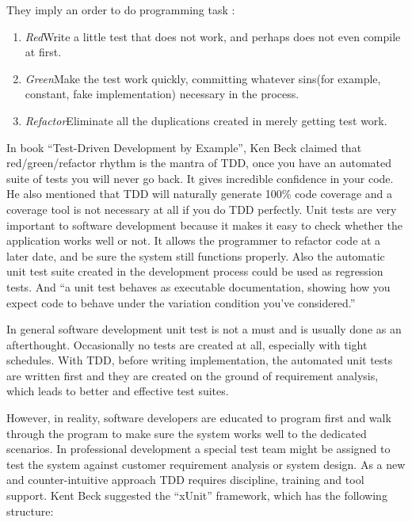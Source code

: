 \documentclass[11pt,twocolumn]{article}
\begin{document}
They imply an order to do programming task \cite{Beck_TDD_2003}:
\begin{enumerate}
\item \emph{Red}\newline Write a little test that does not work, and
  perhaps does not even compile at first.
\item \emph{Green}\newline Make the test work quickly, committing whatever
  sins(for example, constant, fake implementation) necessary in the
  process.
\item \emph{Refactor}\newline Eliminate all the duplications created in
  merely getting test work.
\end{enumerate}

In book ``Test-Driven Development by Example'', Ken Beck claimed that
red/green/refactor rhythm is the mantra of TDD, once you have an automated
suite of tests you will never go back. It gives incredible confidence in
your code. He also mentioned that TDD will naturally generate 100\% code
coverage and a coverage tool is not necessary at all if you do TDD
perfectly.  Unit tests are very important to software development because
it makes it easy to check whether the application works well or not. It
allows the programmer to refactor code at a later date, and be sure the
system still functions properly\cite{UnitTest}. Also the automatic unit
test suite created in the development process could be used as regression
tests. And ``a unit test behaves as executable documentation, showing how
you expect code to behave under the variation condition you've
considered.''\cite{Andy&Dave_2003}

In general software development unit test is not a must and is usually done
as an afterthought. Occasionally no tests are created at all, especially
with tight schedules. With TDD, before writing implementation, the automated
unit tests are written first and they are created on the ground of
requirement analysis, which leads to better and effective test suites.

However, in reality, software developers are educated to program first and walk
through the program to make sure the system works well to the dedicated
scenarios. In professional development a special test team might be assigned to
test the system against customer requirement analysis or system design. As
a new and counter-intuitive approach TDD requires discipline, training and
tool support. Kent Beck suggested the ``xUnit'' framework, which has
the following structure:
\end{document}
